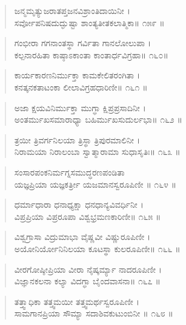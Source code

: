 \begin{verse}
ಜನ್ಮಮೃತ್ಯುಜರಾತಪ್ತಜನವಿಶ್ರಾಂತಿದಾಯಿನೀ ।\\ಸರ್ವೋಪನಿಷದುದ್ಘುಷ್ಟಾ ಶಾಂತ್ಯತೀತಕಲಾತ್ಮಿಕಾ\num{॥ ೧೫೯ ॥}
\end{verse}

\begin{verse}
ಗಂಭೀರಾ ಗಗನಾಂತಸ್ಥಾ ಗರ್ವಿತಾ ಗಾನಲೋಲುಪಾ ।\\ಕಲ್ಪನಾರಹಿತಾ ಕಾಷ್ಠಾಽಕಾಂತಾ  ಕಾಂತಾರ್ಧವಿಗ್ರಹಾ\num{॥ ೧೬೦॥}
\end{verse}

\begin{verse}
ಕಾರ್ಯಕಾರಣನಿರ್ಮುಕ್ತಾ ಕಾಮಕೇಲಿತರಂಗಿತಾ ।\\ಕನತ್ಕನಕತಾಟಂಕಾ ಲೀಲಾವಿಗ್ರಹಧಾರಿಣೀ\num{॥ ೧೬೧ ॥}
\end{verse}

\begin{verse}
ಅಜಾ ಕ್ಷಯವಿನಿರ್ಮುಕ್ತಾ ಮುಗ್ಧಾ ಕ್ಷಿಪ್ರಪ್ರಸಾದಿನೀ ।\\ಅಂತರ್ಮುಖಸಮಾರಾಧ್ಯಾ ಬಹಿರ್ಮುಖಸುದುರ್ಲಭಾ\num{॥ ೧೬೨ ॥}
\end{verse}

\begin{verse}
ತ್ರಯೀ ತ್ರಿವರ್ಗನಿಲಯಾ ತ್ರಿಸ್ಥಾ ತ್ರಿಪುರಮಾಲಿನೀ ।\\ನಿರಾಮಯಾ ನಿರಾಲಂಬಾ ಸ್ವಾತ್ಮಾರಾಮಾ ಸುಧಾಸೃತಿಃ\num{॥ ೧೬೩ ॥}
\end{verse}

\begin{verse}
ಸಂಸಾರಪಂಕನಿರ್ಮಗ್ನಸಮುದ್ಧರಣಪಂಡಿತಾ \\ಯಜ್ಞಪ್ರಿಯಾ ಯಜ್ಞಕರ್ತ್ರೀ ಯಜಮಾನಸ್ವರೂಪಿಣೀ \num{॥ ೧೬೪ ॥}
\end{verse}

\begin{verse}
ಧರ್ಮಾಧಾರಾ ಧನಾಧ್ಯಕ್ಷಾ ಧನಧಾನ್ಯವಿವರ್ಧಿನೀ ।\\ವಿಪ್ರಪ್ರಿಯಾ ವಿಪ್ರರೂಪಾ ವಿಶ್ವಭ್ರಮಣಕಾರಿಣೀ\num{॥ ೧೬೫ ॥}
\end{verse}

\begin{verse}
ವಿಶ್ವಗ್ರಾಸಾ  ವಿದ್ರುಮಾಭಾ ವೈಷ್ಣವೀ ವಿಷ್ಣುರೂಪಿಣೀ ।\\ಅಯೋನಿರ್ಯೋನಿನಿಲಯಾ ಕೂಟಸ್ಥಾ ಕುಲರೂಪಿಣೀ\num{॥ ೧೬೬ ॥}
\end{verse}

\begin{verse}
ವೀರಗೋಷ್ಠೀಪ್ರಿಯಾ ವೀರಾ ನೈಷ್ಕರ್ಮ್ಯಾ ನಾದರೂಪಿಣೀ ।\\ವಿಜ್ಞಾನಕಲನಾ ಕಲ್ಯಾ ವಿದಗ್ಧಾ ಬೈಂದವಾಸನಾ\num{॥ ೧೬೭ ॥}
\end{verse}

\begin{verse}
ತತ್ತ್ವಾಧಿಕಾ ತತ್ತ್ವಮಯೀ ತತ್ತ್ವಮರ್ಥಸ್ವರೂಪಿಣೀ ।\\ಸಾಮಗಾನಪ್ರಿಯಾ ಸೌಮ್ಯಾ  ಸದಾಶಿವಕುಟುಂಬಿನೀ \num{॥ ೧೬೮ ॥}
\end{verse}

